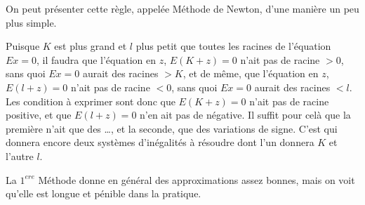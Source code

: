 \documentclass[11pt]{article}
\begin{document}
On peut présenter cette règle, appelée Méthode de Newton, d'une manière un peu plus simple.

Puisque $K$ est plus grand et $l$ plus petit que toutes les racines de l'équation $Ex=0$,
il faudra que l'équation en $z$, $E(K+z)=0$ n'ait pas de racine $>0$, sans quoi 
$Ex=0$ aurait des racines $>K$, et de même, que l'équation en $z$, $E(l+z)=0$ 
n'ait pas de racine $<0$, sans quoi $Ex=0$ aurait des racines $<l$. Les condition à
exprimer sont donc que $E(K+z)=0$ n'ait pas de racine positive, et que $E(l+z)=0$
n'en ait pas de négative. Il suffit pour celà que la première n'ait que des
\dots, et la seconde, que des variations de signe. C'est qui donnera encore
deux systèmes d'inégalités à résoudre dont l'un donnera $K$ et l'autre $l$.\newline

\quad{}\newline

La $1^{ere}$ Méthode donne en général des approximations assez bonnes, mais on voit
qu'elle est longue et pénible dans la pratique.
\end{document}
